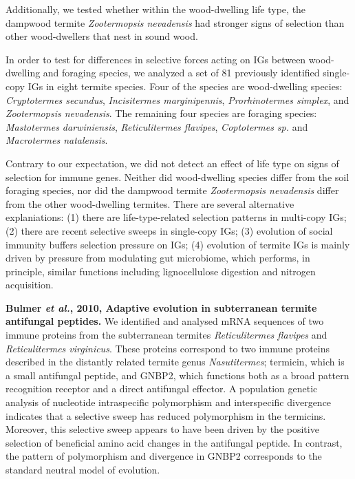 \documentclass[11pt]{article}
\begin{document}
\begin{sloppypar}
Additionally, we tested whether within the wood-dwelling life type, the dampwood termite \textit{Zootermopsis nevadensis} had stronger signs of selection than other wood-dwellers that nest in sound wood.
\par
In order to test for differences in selective forces acting on IGs between wood-dwelling and foraging species, we analyzed a set of 81 previously identified single-copy IGs in eight termite species. 
Four of the species are wood-dwelling species: \textit{Cryptotermes secundus}, \textit{Incisitermes marginipennis}, \textit{Prorhinotermes simplex}, and \textit{Zootermopsis nevadensis}. 
The remaining four species are foraging species: \textit{Mastotermes darwiniensis}, \textit{Reticulitermes flavipes}, \textit{Coptotermes sp.} and \textit{Macrotermes natalensis}. 
\par
Contrary to our expectation, we did not detect an effect of life type on signs of selection for immune genes. 
Neither did wood-dwelling species differ from the soil foraging species, nor did the dampwood termite \textit{Zootermopsis nevadensis} differ from the other wood-dwelling termites. 
There are several alternative explaniations: 
(1) there are life-type-related selection patterns in multi-copy IGs; 
(2) there are recent selective sweeps in single-copy IGs; 
(3) evolution of social immunity buffers selection pressure on IGs; 
(4) evolution of termite IGs is mainly driven by pressure from modulating gut microbiome, which performs, in principle, similar functions including lignocellulose digestion and nitrogen acquisition. 
\par
\textbf{Bulmer \textit{et al.}, 2010, Adaptive evolution in subterranean termite antifungal peptides.} \newline
We identified and analysed mRNA sequences of two immune proteins from the subterranean termites \textit{Reticulitermes flavipes} and \textit{Reticulitermes virginicus}. 
These proteins correspond to two immune proteins described in the distantly related termite genus \textit{Nasutitermes}; termicin, which is a small antifungal peptide, and GNBP2, which functions both as a broad pattern recognition receptor and a direct antifungal effector. 
A population genetic analysis of nucleotide intraspecific polymorphism and interspecific divergence indicates that a selective sweep has reduced polymorphism in the termicins. 
Moreover, this selective sweep appears to have been driven by the positive selection of beneficial amino acid changes in the antifungal peptide. 
In contrast, the pattern of polymorphism and divergence in GNBP2 corresponds to the standard neutral model of evolution.

\end{sloppypar}
\end{document}
